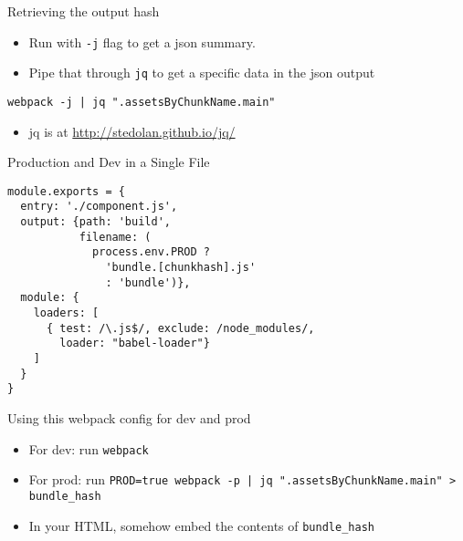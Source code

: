 \documentclass[presentation]{beamer}
\begin{document}
\begin{frame}[fragile,label=sec-9]{Retrieving the output hash}
 \begin{itemize}
\item Run with \texttt{-j} flag to get a json summary.
\item Pipe that through \texttt{jq} to get a specific data in the json output
\end{itemize}

\begin{verbatim}
webpack -j | jq ".assetsByChunkName.main"
\end{verbatim}
\begin{itemize}
\item jq is at \url{http://stedolan.github.io/jq/}
\end{itemize}
\end{frame}

\begin{frame}[fragile,label=sec-10]{Production and Dev in a Single File}
 \begin{verbatim}
module.exports = {
  entry: './component.js',
  output: {path: 'build',
           filename: (
             process.env.PROD ?
               'bundle.[chunkhash].js'
               : 'bundle')},
  module: {
    loaders: [
      { test: /\.js$/, exclude: /node_modules/,
        loader: "babel-loader"}
    ]
  }
}
\end{verbatim}
\end{frame}

\begin{frame}[fragile,label=sec-11]{Using this webpack config for dev and prod}
 \begin{itemize}
\item For dev: run \texttt{webpack}
\item For prod: run \verb~PROD=true webpack -p | jq ".assetsByChunkName.main" >   bundle_hash~
\item In your HTML, somehow embed the contents of \texttt{bundle\_hash}
\end{itemize}
\end{frame}
\end{document}
